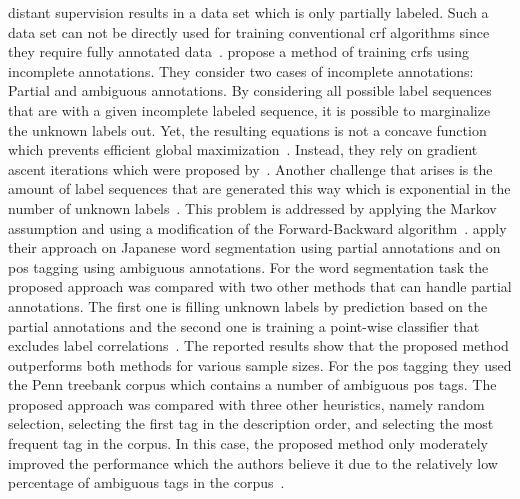 \Gls{distant supervision} results in a data set which is only partially labeled.
Such a data set can not be directly used for training conventional \gls{crf} algorithms since they require fully annotated data~\citep{tsuboi2008training}.
\citet{tsuboi2008training} propose a method of training \glspl{crf} using incomplete annotations.
They consider two cases of incomplete annotations: Partial and ambiguous annotations.
By considering all possible label sequences that are with a given incomplete labeled sequence, it is possible to marginalize the unknown labels out.
Yet, the resulting equations is not a concave function which prevents efficient global maximization~\citep{tsuboi2008training}.
Instead, they rely on gradient ascent iterations which were proposed by~\citep{sha2003shallow}.
Another challenge that arises is the amount of label sequences that are generated this way which is exponential in the number of unknown labels~\citep{tsuboi2008training}.
This problem is addressed by applying the Markov assumption and using a modification of the Forward-Backward algorithm~\citep{tsuboi2008training}.
\citet{tsuboi2008training} apply their approach on Japanese word segmentation using partial annotations and on \gls{pos} tagging using ambiguous annotations.
For the word segmentation task the proposed approach was compared with two other methods that can handle partial annotations.
The first one is filling unknown labels by prediction based on the partial annotations and the second one is training a point-wise classifier that excludes label correlations~\citep{tsuboi2008training}.
The reported results show that the proposed method outperforms both methods for various sample sizes.
For the \gls{pos} tagging they used the Penn treebank corpus \citep{marcus1993building} which contains a number of ambiguous \gls{pos} tags.
The proposed approach was compared with three other heuristics, namely random selection, selecting the first tag in the description order, and selecting the most frequent tag in the corpus.
In this case, the proposed method only moderately improved the performance which the authors believe it due to the relatively low percentage of ambiguous tags in the corpus~\citep{tsuboi2008training}.\\


